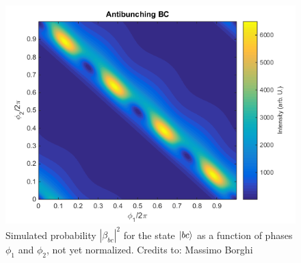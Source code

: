 \begin{figure}
\centering
\includegraphics[width = .8\textwidth]{img/Antibunching_BC}
\caption{Simulated probability $|\beta_{bc}|^2$ for the state $\ket{bc}$ as a function of phases $\phi_1$ and $\phi_2$, not yet normalized. Credits to: Massimo Borghi}\label{antibounchstate}
\end{figure}

